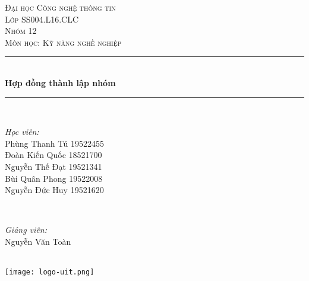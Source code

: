 \documentclass[12pt]{article}
\begin{document}
\maketitle
\begin{titlepage}


\newcommand{\HRule}{\rule{\linewidth}{0.5mm}} %

\center %
 

\textsc{\LARGE Đại học Công nghệ thông tin}\\[1.5cm] %
\textsc{\Large Lớp SS004.L16.CLC}\\[0.5cm] %
\textsc{\LARGE \color{red} Nhóm 12}\\[0.4cm]
\textsc{\large Môn học: Kỹ năng nghề nghiệp }\\[0.5cm] %


\HRule \\[0.4cm]
{ \huge \bfseries Hợp đồng thành lập nhóm}\\[0.4cm] %
\HRule \\[1.5cm]
 

\begin{minipage}{0.4\textwidth}
\begin{flushleft} \large
\emph{Học viên:}\\
Phùng Thanh Tú  19522455
\\
Đoàn Kiến Quốc  18521700
\\
Nguyễn Thế Đạt   19521341
\\
Bùi Quân Phong   19522008
\\
Nguyễn Đức Huy   19521620
\\%
\end{flushleft}
\end{minipage}
~
\begin{minipage}{0.4\textwidth}
\begin{flushright} \large
\emph{Giảng viên:} \\
Nguyễn Văn Toàn %
\end{flushright}
\end{minipage}\\[2cm]
\texttt{[image: logo-uit.png]}
\end{titlepage}
\end{document}
